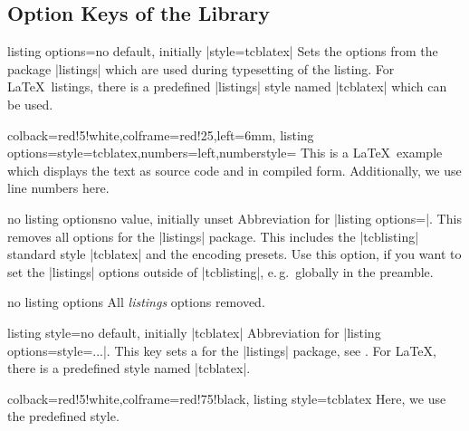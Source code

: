 \clearpage
\subsection{Option Keys of the  Library}\label{sec:speclistingkeys}

\begin{docTcbKey}{listing options}{=}{no default, initially |style=tcblatex|}
  Sets the options from the package |listings| \cite{hoffmann:listings}
  which are used during typesetting of the listing.
  For \LaTeX\ listings, there is a predefined |listings| style named |tcblatex|
  which can be used.
\begin{dispExample}
\begin{tcblisting}{colback=red!5!white,colframe=red!25,left=6mm,
listing options={style=tcblatex,numbers=left,numberstyle=\tiny\color{red!75!black}}}
This is a \LaTeX\ example which displays the text as source code
and in compiled form. Additionally, we use line numbers here.
\end{tcblisting}
\end{dispExample}
\end{docTcbKey}


\begin{docTcbKey}{no listing options}{}{no value, initially unset}
  Abbreviation for |listing options={}|.
  This removes all options for the |listings| package.
  This includes the |tcblisting| standard style |tcblatex| and the encoding presets.
  Use this option, if you want to set the |listings| options outside of |tcblisting|, e.\,g.\ globally in
  the preamble.
\begin{dispExample}
\begin{tcblisting}{no listing options}
All \textit{listings} options removed.
\end{tcblisting}
\end{dispExample}
\end{docTcbKey}


\begin{docTcbKey}{listing style}{=}{no default, initially |tcblatex|}
  Abbreviation for |listing options={style=...}|. This key sets a 
  for the |listings| package, see \cite{hoffmann:listings}.
  For \LaTeX, there is a predefined style named |tcblatex|.
\begin{dispExample}
\begin{tcblisting}{colback=red!5!white,colframe=red!75!black,
listing style=tcblatex}
Here, we use the predefined style.
\end{tcblisting}
\end{dispExample}
\end{docTcbKey}

